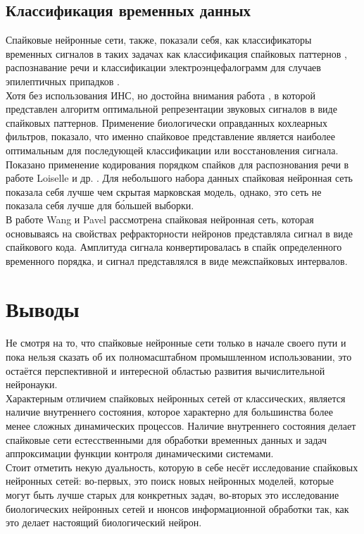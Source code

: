\documentclass[a4paper,10pt]{article}
\begin{document}
\subsection{Классификация временных данных}
\indent Спайковые нейронные сети, также, показали себя, как классификаторы временных сигналов в таких задачах как классификация спайковых паттернов \cite{ponulak2010supervised,maass2002paradigms}, распознавание речи \cite{brody2003simple,gutig2009time} и классификации электроэнцефалограмм для случаев эпилептичных припадков \cite{ghosh2009new}.\\
\indent Хотя без использования ИНС, но достойна внимания работа \cite{smith2006efficient}, в которой представлен алгоритм оптимальной репрезентации звуковых сигналов в виде спайковых паттернов. Применение биологически оправданных кохлеарных фильтров, показало, что именно спайковое представление является наиболее оптимальным для последующей классификации или восстановления сигнала.\\
\indent Показано применение кодирования порядком спайков для распознования речи в работе Loiselle и др. \cite{loiselle2005exploration}. Для небольшого набора данных спайковая нейронная сеть показала себя лучше чем скрытая марковская модель, однако, это сеть не показала себя лучше для б\'{о}льшей выборки.\\
\indent В работе Wang и Pavel \cite{wang2005spiking} рассмотрена спайковая нейронная сеть, которая основываясь на свойствах рефракторности нейронов представляла сигнал в виде спайкового кода. Амплитуда сигнала конвертировалась в спайк определенного временного порядка, и сигнал представлялся в виде межспайковых интервалов.\\
\section{Выводы}
\indent Не смотря на то, что спайковые нейронные сети только в начале своего пути и пока нельзя сказать об их  полномасштабном промышленном использовании, это остаётся перспективной и интересной областью развития вычислительной нейронауки.\\
\indent Характерным отличием спайковых нейронных сетей от классических, является наличие внутреннего состояния, которое характерно для большинства более менее сложных динамических процессов. Наличие внутреннего состояния делает спайковые сети естесственными для обработки временных данных и задач аппроксимации функции контроля динамическими системами.\\
\indent Стоит отметить некую дуальность, которую в себе несёт исследование спайковых нейронных сетей: во-первых, это поиск новых нейронных моделей, которые могут быть лучше старых для конкретных задач, во-вторых это исследование биологических нейронных сетей и нюнсов информационной обработки так, как это делает настоящий биологический нейрон.\\

{}

\end{document}
